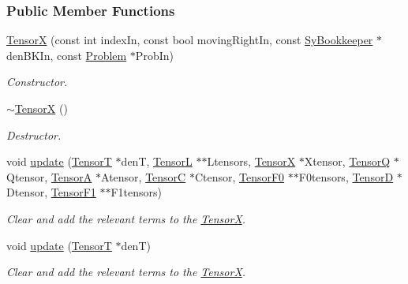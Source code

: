 \subsubsection*{Public Member Functions}
\begin{DoxyCompactItemize}
\item 
\hyperlink{classCheMPS2_1_1TensorX_a494fde7a79bf746d09d92b9fe26a3201}{Tensor\-X} (const int index\-In, const bool moving\-Right\-In, const \hyperlink{classCheMPS2_1_1SyBookkeeper}{Sy\-Bookkeeper} $\ast$den\-B\-K\-In, const \hyperlink{classCheMPS2_1_1Problem}{Problem} $\ast$Prob\-In)
\begin{DoxyCompactList}\small\item\em Constructor. \end{DoxyCompactList}\item 
\hypertarget{classCheMPS2_1_1TensorX_af9f8e434f869bf10d7110686411dc95c}{\hyperlink{classCheMPS2_1_1TensorX_af9f8e434f869bf10d7110686411dc95c}{$\sim$\-Tensor\-X} ()}\label{classCheMPS2_1_1TensorX_af9f8e434f869bf10d7110686411dc95c}

\begin{DoxyCompactList}\small\item\em Destructor. \end{DoxyCompactList}\item 
void \hyperlink{classCheMPS2_1_1TensorX_aeaf43e54ecdf8749753d29edf60112ab}{update} (\hyperlink{classCheMPS2_1_1TensorT}{Tensor\-T} $\ast$den\-T, \hyperlink{classCheMPS2_1_1TensorL}{Tensor\-L} $\ast$$\ast$Ltensors, \hyperlink{classCheMPS2_1_1TensorX}{Tensor\-X} $\ast$Xtensor, \hyperlink{classCheMPS2_1_1TensorQ}{Tensor\-Q} $\ast$Qtensor, \hyperlink{classCheMPS2_1_1TensorA}{Tensor\-A} $\ast$Atensor, \hyperlink{classCheMPS2_1_1TensorC}{Tensor\-C} $\ast$Ctensor, \hyperlink{classCheMPS2_1_1TensorF0}{Tensor\-F0} $\ast$$\ast$F0tensors, \hyperlink{classCheMPS2_1_1TensorD}{Tensor\-D} $\ast$Dtensor, \hyperlink{classCheMPS2_1_1TensorF1}{Tensor\-F1} $\ast$$\ast$F1tensors)
\begin{DoxyCompactList}\small\item\em Clear and add the relevant terms to the \hyperlink{classCheMPS2_1_1TensorX}{Tensor\-X}. \end{DoxyCompactList}\item 
void \hyperlink{classCheMPS2_1_1TensorX_a0030fdecfeac6021f378febe95614c79}{update} (\hyperlink{classCheMPS2_1_1TensorT}{Tensor\-T} $\ast$den\-T)
\begin{DoxyCompactList}\small\item\em Clear and add the relevant terms to the \hyperlink{classCheMPS2_1_1TensorX}{Tensor\-X}. \end{DoxyCompactList}\end{DoxyCompactItemize}
